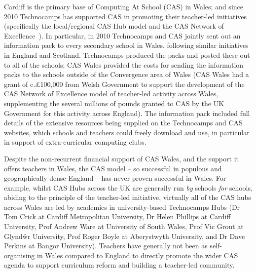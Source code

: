 Cardiff is the primary base of Computing At School (CAS) in Wales;
and since 2010 Technocamps has supported CAS
in promoting their teacher-led initiatives
(specifically the local/regional CAS Hub model and the CAS Network of
Excellence~\cite{brown-et-al-toce2014,sentance-et-al-wipsce2014}).
In particular, in 2010 Technocamps and CAS jointly sent out an
information pack to every secondary school in Wales, following similar
initiatives in England and Scotland. Technocamps produced the packs
and posted these out to all of the schools; CAS Wales provided the
costs for sending the information packs to the schools outside of the
Convergence area of Wales (CAS Wales had a grant of c.\pounds100,000
from Welsh Government to support the development of the CAS Network of
Excellence model of teacher-led activity across Wales, supplementing
the several millions of pounds granted to CAS by the UK Government for
this activity across England).  The information pack included full
details of the extensive resources being supplied on the Technocamps
and CAS websites, which schools and teachers could freely download and
use, in particular in support of extra-curricular computing clubs.

 

Despite the non-recurrent financial support of CAS Wales, and the
support it offers teachers in Wales, the CAS model -- so successful in
populous and geographically dense England -- has never proven
successful in Wales.  For example, whilst CAS Hubs across the UK are
generally run \emph{by} schools \emph{for} schools, abiding to the
principle of the teacher-led initiative, virtually all of the CAS hubs
across Wales are led by academics in university-based Technocamps Hubs
(Dr Tom Crick at Cardiff Metropolitan University, Dr Helen Phillips at
Cardiff University, Prof Andrew Ware at University of South Wales,
Prof Vic Grout at Glynd\^{w}r University, Prof Roger Boyle at
Aberystwyth University, and Dr Dave Perkins at Bangor University).
Teachers have generally not been as self-organising in Wales compared
to England to directly promote the wider CAS agenda to support
curriculum reform and building a teacher-led community.

